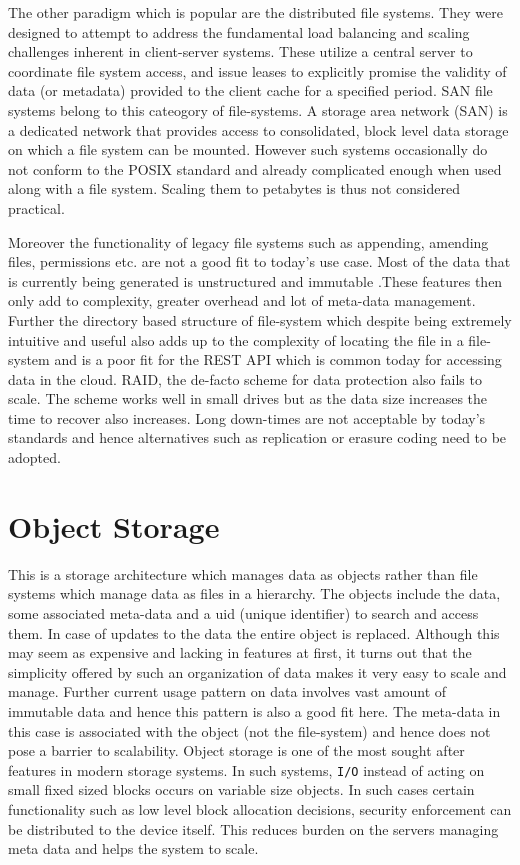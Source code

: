 \documentclass[a4paper,10pt]{article}
\begin{document}
The other paradigm which is popular are the distributed  file systems. They were designed to attempt to address the fundamental load balancing and scaling challenges inherent in client-server systems. These utilize a central server to coordinate file system access, and issue leases to explicitly promise the validity of data (or metadata) provided to the client cache for a specified period. SAN file systems belong to this cateogory of file-systems. A storage area network (SAN) is a dedicated network that provides access to consolidated, block level data storage on which a file system can be mounted. However such systems occasionally do not conform to the POSIX standard and already complicated enough when used along with a file system. Scaling them to petabytes is thus not considered practical.

Moreover the functionality of legacy file systems such as appending, amending files, permissions etc. are not a good fit to today’s use case. Most of the data that is currently being generated is unstructured and immutable .These features then only add to complexity, greater overhead and lot of meta-data management. Further the directory based structure of file-system which despite being extremely intuitive and useful also adds up to the complexity of locating the file in a file-system and is a poor fit for the REST API which is common today for accessing data in the cloud. RAID, the de-facto scheme for data protection also fails to scale. The scheme works well in small drives but as the data size increases the time to recover also increases. Long down-times are not acceptable by today’s standards and hence alternatives such as replication or erasure coding need to be adopted. 

\newpage    
\section{Object Storage}
    This is a storage architecture which manages data as objects rather than file systems which manage data as files in a hierarchy. The objects include the data, some associated meta-data and a uid (unique identifier) to search and access them. In case of updates to the data the entire object is replaced. Although this may seem as expensive and lacking in features at first, it turns out that the simplicity offered by such an organization of data makes it very easy to scale and manage. Further current usage pattern on data involves vast amount of immutable data and hence this pattern is also a good fit here. The meta-data in this case is associated with the object (not the file-system) and hence does not pose a barrier to scalability. Object storage is one of the most sought after features in modern storage systems. In such systems, \verb|I/O| instead of acting on small fixed sized blocks occurs on variable size objects. In such cases certain functionality such as low level block allocation decisions, security enforcement can be distributed to the device itself. This reduces burden on the servers managing meta data and helps the system to scale.
    
\end{document}

